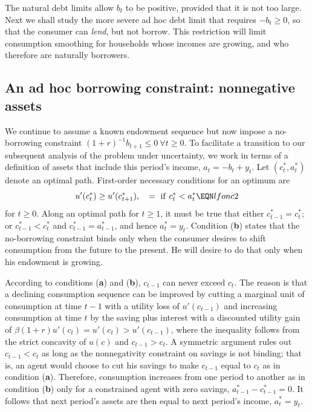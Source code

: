 The natural debt limits allow $b_t$ to be positive, provided that
it is not too large. Next we shall study the more severe ad hoc
debt limit that requires $- b_t \geq 0$, so that the consumer can
{\it lend\/}, but not borrow.  This restriction will limit consumption smoothing
for households whose incomes are growing, and  who therefore are
naturally borrowers.

\subsection{An ad hoc borrowing constraint: nonnegative assets}\label{sec:ad_hoc_borrowing}%
We continue to assume a known endowment sequence but
 now impose a no-borrowing constraint
$(1+r)^{-1} b_{t+1}  \leq 0  \
 \forall t \geq 0$.  To facilitate a transition to our subsequent
analysis of the problem under uncertainty, we work in terms of a
definition of assets that include this period's income, $a_t =
-b_t+y_t$. Let $(c_t^*, a_t^*)$ denote an
optimal path. First-order necessary conditions for an optimum are
$$ u'(c_t^*) \geq u'(c_{t+1}^*),  \quad = \ {\rm if} \ c_t^* < a_t^*
 \EQN lfonc2 $$
for $t\geq 0$.
Along an optimal path for $t \geq 1$, it must be true that either
\medskip
{} $c^*_{t-1} = c^*_t$; or
 $c^*_{t-1} < c^*_t$ and $c^*_{t-1} = a^*_{t-1}$,
and hence $a^*_{t} = y_t$.
\medskip
\noindent
Condition ({\bf b}) states that the no-borrowing constraint binds only when
the consumer desires to shift consumption from the future to the present.
He will desire to do that only when his endowment is
growing.

According to conditions ({\bf a}) and ({\bf b}), $c_{t-1}$ can never exceed $c_t$.
The reason is that a declining consumption sequence can be
improved by cutting a marginal unit of
consumption at time $t-1$ with a utility loss of $u'(c_{t-1})$
and increasing consumption at time $t$ by the saving plus
interest with a discounted utility gain of
$\beta (1+r) u'(c_t) = u'(c_t) >  u'(c_{t-1})$, where the
inequality follows from the strict concavity of $u(c)$ and
$c_{t-1}>c_t$. A symmetric argument rules out
$c_{t-1}<c_t$ as long as the nonnegativity constraint on savings
is not binding; that is, an agent would choose to cut his savings
to make $c_{t-1}$ equal to $c_t$ as in condition ({\bf a}). Therefore,
consumption increases from one period to another as in condition ({\bf b})
only for a constrained agent with zero savings,
$a^*_{t-1}-c^*_{t-1}=0$. It follows that next period's assets
are then equal to next period's income, $a^*_t = y_t$.

